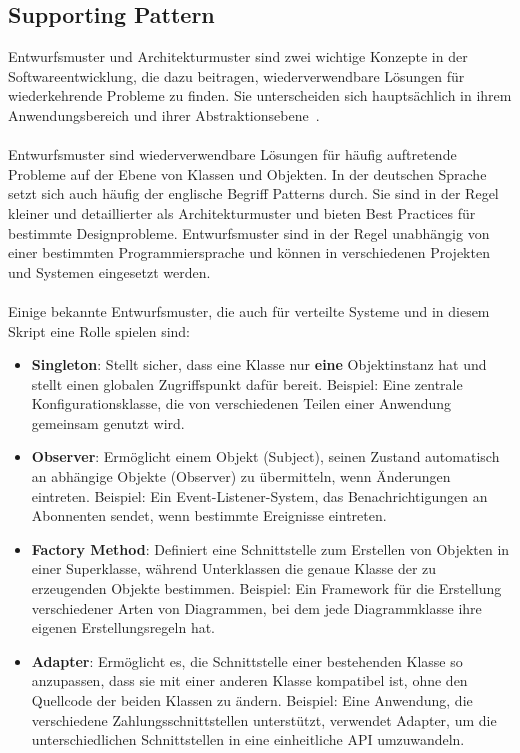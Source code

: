 \documentclass[../vs-script-first-v01.tex]{subfiles}
\begin{document}
\label{Woche04}\subsection{Supporting Pattern}

Entwurfsmuster und Architekturmuster sind zwei wichtige Konzepte in der Softwareentwicklung, die dazu beitragen, wiederverwendbare Lösungen für wiederkehrende Probleme zu finden. Sie unterscheiden sich hauptsächlich in ihrem Anwendungsbereich und ihrer Abstraktionsebene~\cite{gamma1994design}.
\\\\
Entwurfsmuster sind wiederverwendbare Lösungen für häufig auftretende Probleme auf der Ebene von Klassen und Objekten. In der deutschen Sprache setzt sich auch häufig der englische Begriff Patterns durch. Sie sind in der Regel kleiner und detaillierter als Architekturmuster und bieten Best Practices für bestimmte Designprobleme. Entwurfsmuster sind in der Regel unabhängig von einer bestimmten Programmiersprache und können in verschiedenen Projekten und Systemen eingesetzt werden.
\\\\
Einige bekannte Entwurfsmuster, die auch für verteilte Systeme und in diesem Skript eine Rolle spielen sind:
\begin{itemize}
\item \textbf{Singleton}: Stellt sicher, dass eine Klasse nur \textbf{eine} Objektinstanz hat und stellt einen globalen Zugriffspunkt dafür bereit. Beispiel: Eine zentrale Konfigurationsklasse, die von verschiedenen Teilen einer Anwendung gemeinsam genutzt wird.
\item \textbf{Observer}: Ermöglicht einem Objekt (Subject), seinen Zustand automatisch an abhängige Objekte (Observer) zu übermitteln, wenn Änderungen eintreten. Beispiel: Ein Event-Listener-System, das Benachrichtigungen an Abonnenten sendet, wenn bestimmte Ereignisse eintreten.
\item \textbf{Factory Method}: Definiert eine Schnittstelle zum Erstellen von Objekten in einer Superklasse, während Unterklassen die genaue Klasse der zu erzeugenden Objekte bestimmen. Beispiel: Ein Framework für die Erstellung verschiedener Arten von Diagrammen, bei dem jede Diagrammklasse ihre eigenen Erstellungsregeln hat.
\item \textbf{Adapter}: Ermöglicht es, die Schnittstelle einer bestehenden Klasse so anzupassen, dass sie mit einer anderen Klasse kompatibel ist, ohne den Quellcode der beiden Klassen zu ändern. Beispiel: Eine Anwendung, die verschiedene Zahlungsschnittstellen unterstützt, verwendet Adapter, um die unterschiedlichen Schnittstellen in eine einheitliche API umzuwandeln.
\end{itemize}
\end{document}
